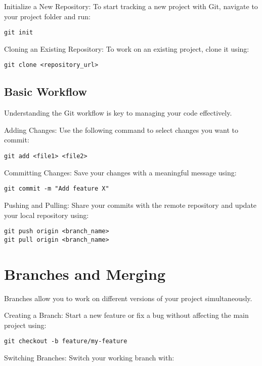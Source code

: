 \documentclass[10pt,twocolumn]{article}
\begin{document}
Initialize a New Repository: To start tracking a new project with Git, navigate to your project folder and run:

\begin{verbatim}
git init
\end{verbatim}

Cloning an Existing Repository: To work on an existing project, clone it using:

\begin{verbatim}
git clone <repository_url>
\end{verbatim}

\subsection{Basic Workflow}

Understanding the Git workflow is key to managing your code effectively.

Adding Changes: Use the following command to select changes you want to commit:

\begin{verbatim}
git add <file1> <file2>
\end{verbatim}

Committing Changes: Save your changes with a meaningful message using:

\begin{verbatim}
git commit -m "Add feature X"
\end{verbatim}

Pushing and Pulling: Share your commits with the remote repository and update your local repository using:

\begin{verbatim}
git push origin <branch_name>
git pull origin <branch_name>
\end{verbatim}

\section{Branches and Merging}

Branches allow you to work on different versions of your project simultaneously.

Creating a Branch: Start a new feature or fix a bug without affecting the main project using:

\begin{verbatim}
git checkout -b feature/my-feature
\end{verbatim}

Switching Branches: Switch your working branch with:
\end{document}
